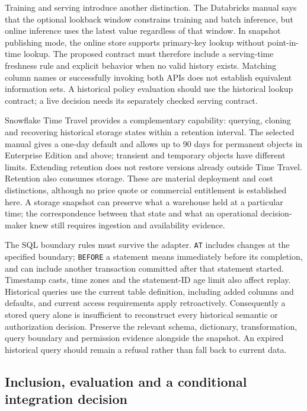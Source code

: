 Training and serving introduce another distinction. The Databricks manual says
that the optional lookback window constrains training and batch inference, but
online inference uses the latest value regardless of that window. In snapshot
publishing mode, the online store supports primary-key lookup without
point-in-time lookup. The proposed contract must therefore include a serving-time
freshness rule and explicit behavior when no valid history exists. Matching column
names or successfully invoking both APIs does not establish equivalent information
sets. A historical policy evaluation should use the historical lookup contract;
a live decision needs its separately checked serving contract.
\cite{exec22_obs_databricks_pit}

Snowflake Time Travel provides a complementary capability: querying, cloning and
recovering historical storage states within a retention interval. The selected
manual gives a one-day default and allows up to 90 days for permanent objects in
Enterprise Edition and above; transient and temporary objects have different
limits. Extending retention does not restore versions already outside Time Travel.
Retention also consumes storage. These are material deployment and cost
distinctions, although no price quote or commercial entitlement is established
here. A storage snapshot can preserve what a warehouse held at a particular time;
the correspondence between that state and what an operational decision-maker knew
still requires ingestion and availability evidence.\cite{exec22_obs_snowflake_time}

The SQL boundary rules must survive the adapter. \texttt{AT} includes changes at
the specified boundary; \texttt{BEFORE} a statement means immediately before its
completion, and can include another transaction committed after that statement
started. Timestamp casts, time zones and the statement-ID age limit also affect
replay. Historical queries use the current table definition, including added
columns and defaults, and current access requirements apply retroactively.
Consequently a stored query alone is insufficient to reconstruct every historical
semantic or authorization decision. Preserve the relevant schema, dictionary,
transformation, query boundary and permission evidence alongside the snapshot.
An expired historical query should remain a refusal rather than fall back to
current data.\cite{exec22_obs_snowflake_at}

\subsection{Inclusion, evaluation and a conditional integration decision}
\label{exec22:obs-selection}

